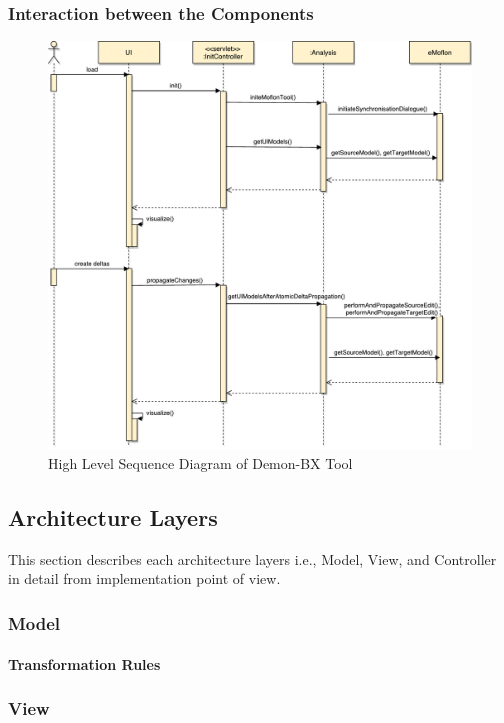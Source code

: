 \subsubsection{Interaction between the Components}\label{subsubsec:componentinteraction}

\begin{figure}
	\includegraphics[width=1\textwidth]{figures/Sequence_Diagram}
	\caption{High Level Sequence Diagram of Demon-BX Tool}
	\label{fig:Sequence_Diagram}
\end{figure}

\subsection{Architecture Layers}\label{subsec:imple_layers}
This section describes each architecture layers i.e., Model, View, and Controller in detail from implementation point of view.

\subsubsection{Model}\label{subsubsec:imple_model}
\paragraph{Transformation Rules}

\subsubsection{View}\label{subsubsec:imple_view}

